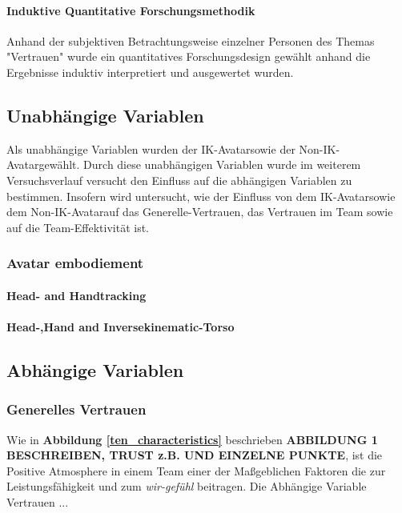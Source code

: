 \documentclass[a4paper,11pt]{article}%
\renewcommand{\\}{\vspace*{0.5\baselineskip} \newline}
\begin{document}
				\paragraph{Induktive Quantitative Forschungsmethodik}
				Anhand der subjektiven Betrachtungsweise einzelner Personen des Themas "Vertrauen" wurde ein quantitatives Forschungsdesign gewählt anhand die Ergebnisse induktiv interpretiert und ausgewertet wurden.
		
\subsection{Unabhängige Variablen}
Als unabhängige Variablen wurden der \flqq IK-Avatar\frqq sowie der \flqq Non-IK-Avatar\frqq gewählt. Durch diese  unabhängigen Variablen wurde im weiterem Versuchsverlauf versucht den Einfluss auf die abhängigen Variablen zu bestimmen.
Insofern wird untersucht, wie der Einfluss von dem \flqq IK-Avatar\frqq sowie dem \flqq Non-IK-Avatar\frqq auf das Generelle-Vertrauen, das Vertrauen im Team sowie auf die Team-Effektivität ist.
			\subsubsection{Avatar embodiement}
				\paragraph{Head- and Handtracking}
				\paragraph{Head-,Hand and Inversekinematic-Torso}
	
\subsection{Abhängige Variablen}
			\subsubsection{Generelles Vertrauen}
			Wie in \textbf{Abbildung \ref{ten_characteristics}} beschrieben \textbf{ABBILDUNG 1 BESCHREIBEN, TRUST z.B. UND EINZELNE PUNKTE}, ist die Positive Atmosphere in einem Team einer der Maßgeblichen Faktoren die zur Leistungsfähigkeit und zum \textit{\glqq wir-gefühl\grqq} beitragen.
			Die Abhängige Variable Vertrauen ...	
\end{document}
